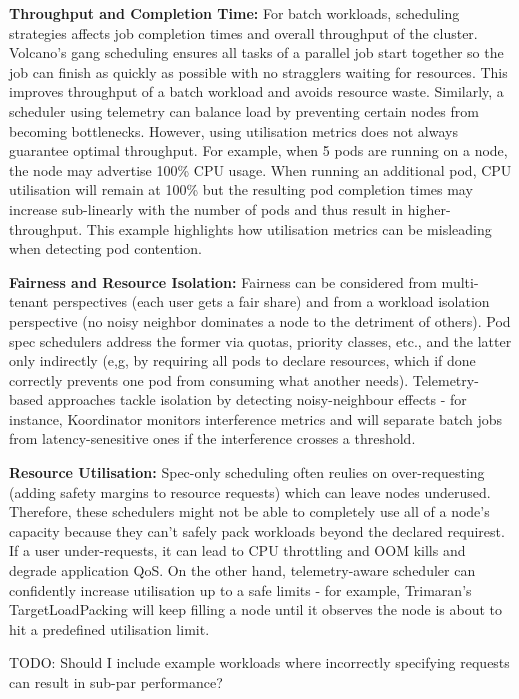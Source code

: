 \textbf{Throughput and Completion Time:} For batch workloads, scheduling
strategies affects job completion times and overall throughput of the cluster.
Volcano's \cite{} gang scheduling ensures all tasks of a parallel job start
together so the job can finish as quickly as possible with no stragglers waiting
for resources. This improves throughput of a batch workload and avoids resource
waste. Similarly, a scheduler using telemetry can balance load by preventing
certain nodes from becoming bottlenecks. However, using utilisation metrics does
not always guarantee optimal throughput. For example, when 5 pods are running on
a node, the node may advertise 100\% CPU usage. When running an additional pod,
CPU utilisation will remain at 100\% but the resulting pod completion times
may increase sub-linearly with the number of pods and thus result in
higher-throughput. This example highlights how utilisation metrics can be
misleading when detecting pod contention.

\textbf{Fairness and Resource Isolation:} Fairness can be considered from
multi-tenant perspectives (each user gets a fair share) and from a workload
isolation perspective (no noisy neighbor dominates a node to the detriment of
others). Pod spec schedulers address the former via quotas, priority classes,
etc., and the latter only indirectly (e,g, by requiring all pods to declare
resources, which if done correctly prevents one pod from consuming what another
needs). Telemetry-based approaches tackle isolation by detecting noisy-neighbour
effects - for instance, Koordinator monitors interference metrics and will
separate batch jobs from latency-senesitive ones if the interference crosses a
threshold.

\textbf{Resource Utilisation:} Spec-only scheduling often reulies on
over-requesting (adding safety margins to resource requests) which can leave
nodes underused. Therefore, these schedulers might not be able to
completely use all of a node's capacity because they can't safely pack workloads
beyond the declared requirest. If a user under-requests, it can lead to CPU
throttling and OOM kills and degrade application QoS. On the other hand,
telemetry-aware scheduler can confidently increase utilisation up to a safe
limits - for example, Trimaran's TargetLoadPacking will keep filling a node
until it observes the node is about to hit a predefined utilisation limit.

TODO: Should I include example workloads where incorrectly specifying requests
can result in sub-par performance?


